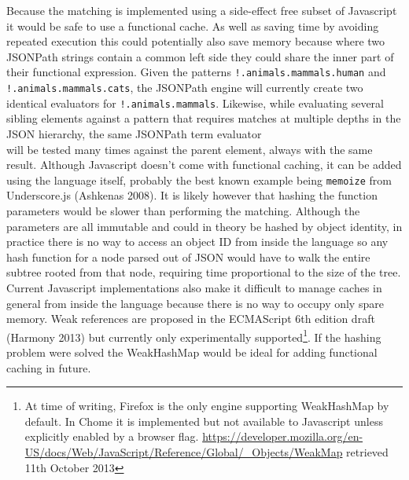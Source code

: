 \documentclass[12pt, ]{article}
\begin{document}
Because the matching is implemented using a side-effect free subset of
Javascript it would be safe to use a functional cache. As well as saving
time by avoiding repeated execution this could potentially also save
memory because where two JSONPath strings contain a common left side
they could share the inner part of their functional expression. Given
the patterns \texttt{!.animals.mammals.human} and
\texttt{!.animals.mammals.cats}, the JSONPath engine will currently
create two identical evaluators for \texttt{!.animals.mammals}.
Likewise, while evaluating several sibling elements against a pattern
that requires matches at multiple depths in the JSON hierarchy, the same
JSONPath term evaluator\\will be tested many times against the parent
element, always with the same result. Although Javascript doesn't come
with functional caching, it can be added using the language itself,
probably the best known example being \texttt{memoize} from
Underscore.js (Ashkenas 2008). It is likely however that hashing the
function parameters would be slower than performing the matching.
Although the parameters are all immutable and could in theory be hashed
by object identity, in practice there is no way to access an object ID
from inside the language so any hash function for a node parsed out of
JSON would have to walk the entire subtree rooted from that node,
requiring time proportional to the size of the tree. Current Javascript
implementations also make it difficult to manage caches in general from
inside the language because there is no way to occupy only spare memory.
Weak references are proposed in the ECMAScript 6th edition draft
(Harmony 2013) but currently only experimentally supported\footnote{At
  time of writing, Firefox is the only engine supporting WeakHashMap by
  default. In Chome it is implemented but not available to Javascript
  unless explicitly enabled by a browser flag.
  \url{https://developer.mozilla.org/en-US/docs/Web/JavaScript/Reference/Global/_Objects/WeakMap}
  retrieved 11th October 2013}. If the hashing problem were solved the
WeakHashMap would be ideal for adding functional caching in future.
\end{document}
